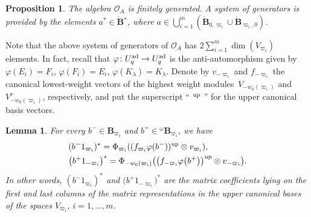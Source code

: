 \documentclass[pdftex]{sigma}
\numberwithin{equation}{section}
\newtheorem{lem}[teo]{Lemma}
\newtheorem{prop}[teo]{Proposition}
\theoremstyle{definition}
\newcommand{\Oo}{{\mathcal O}}
\newcommand{\ra}{\rightarrow}
\begin{document}
\begin{prop}\label{genOA} The algebra $\Oo_A$ is finitely generated. A system of generators is provided by the elements $a^*\in \dot {\mathbf{B}} {}^*$, where $a \in \bigcup_{i=1}^m (\dot{\mathbf{B}}_{0,\varpi_i}\cup \dot{\mathbf{B}}_{\varpi_i,0})$.\end{prop}
Note that the above system of generators of $\Oo_A$ has
$2 \sum_{i=1}^m \dim(V_{\varpi_i})$
 elements. In fact, recall that $\varphi\colon U_q^{\rm ad} \ra U_q^{\rm ad}$ is the anti-automorphism given by $\varphi(E_i) = F_i$, $\varphi(F_i) = E_i$, $\varphi(K_\lambda) = K_{\lambda}$. Denote by $v_{-\varpi_i}$ and $f_{-\varpi_i}$ the canonical lowest-weight vectors of the highest weight modules~${V_{-w_0(\varpi_i)}}$ and $V_{-w_0(\varpi_i)}^r$, respectively, and put the superscript `` ${}^{\rm up}$ '' for the upper canonical basis vectors.
\begin{lem} For every $b^- \in \mathbf{B}_{\varpi_i}$ and $b^+\in {}^\omega \mathbf{B}_{\varpi_i}$, we have
\begin{align}
 &(b^-1_{\varpi_i})^* = \Phi_{\varpi_i}((f_{\varpi_i} \varphi(b^-))^{\rm up} \otimes v_{\varpi_i}), \label{formgenOA1} \\
 &\big(b^+1_{-\varpi_i}\big)^* = \Phi_{-w_0(\varpi_i)}\big(\big(f_{-\varpi_i} \varphi\big(b^+\big)\big)^{\rm up} \otimes v_{-\varpi_i}\big). \label{formgenOA2} \end{align}
In other words, $(b^-1_{\varpi_i})^*$ and $\big(b^+1_{-\varpi_i}\big)^*$ are the matrix coefficients lying on the first and last columns of the matrix representations in the upper canonical bases of the spaces $V_{\varpi_i}$, ${i=1,\dots, m}$.
\end{lem}
\end{document}
